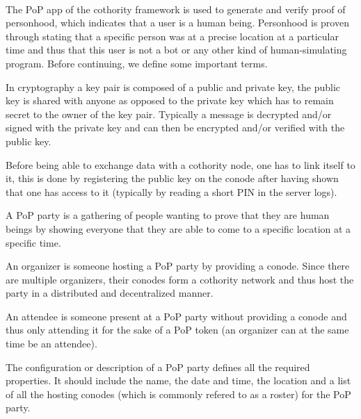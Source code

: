 \paragraph{}
The PoP app of the cothority framework is used to generate and verify proof of personhood, which indicates that a user is a human being. Personhood is proven through stating that a specific person was at a precise location at a particular time and thus that this user is not a bot or any other kind of human-simulating program. Before continuing, we define some important terms.

\begin{description}[style=nextline]
\item[Key Pair] In cryptography a key pair is composed of a public and private key, the public key is shared with anyone as opposed to the private key which has to remain secret to the owner of the key pair. Typically a message is decrypted and/or signed with the private key and can then be encrypted and/or verified with the public key.

\item[Conode Linking] Before being able to exchange data with a cothority node, one has to link itself to it, this is done by registering the public key on the conode after having shown that one has access to it (typically by reading a short PIN in the server logs).

\item[PoP Party] A PoP party is a gathering of people wanting to prove that they are human beings by showing everyone that they are able to come to a specific location at a specific time.

\item[Organizer (Org)] An organizer is someone hosting a PoP party by providing a conode. Since there are multiple organizers, their conodes form a cothority network and thus host the party in a distributed and decentralized manner.

\item[Attendee (Att)] An attendee is someone present at a PoP party without providing a conode and thus only attending it for the sake of a PoP token (an organizer can at the same time be an attendee).

\item[PoP Party Configuration/Description (Config/Desc)] The configuration or description of a PoP party defines all the required properties. It should include the name, the date and time, the location and a list of all the hosting conodes (which is commonly refered to as a roster) for the PoP party.


\end{description}
